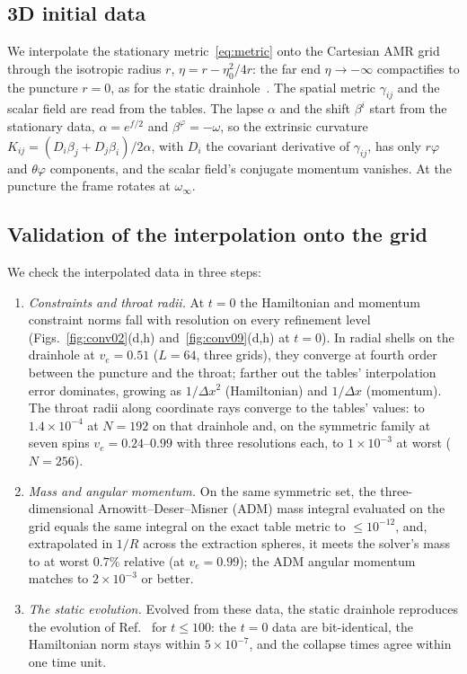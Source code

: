 \documentclass[twocolumn,floatfix,aps,prd,superscriptaddress,nofootinbib]{revtex4-2}
\begin{document}
\subsection{3D initial data}
\label{sec:setup:id}

We interpolate the stationary metric~\eqref{eq:metric} onto the Cartesian AMR grid through the isotropic radius $r$, $\eta=r-\eta_0^2/4r$: the far end $\eta\to-\infty$ compactifies to the puncture $r=0$, as for the static drainhole~\cite{shirokov2026}. The spatial metric $\gamma_{ij}$ and the scalar field are read from the tables. The lapse $\alpha$ and the shift $\beta^i$ start from the stationary data, $\alpha=e^{f/2}$ and $\beta^\varphi=-\omega$, so the extrinsic curvature $K_{ij}=(D_i\beta_j+D_j\beta_i)/2\alpha$, with $D_i$ the covariant derivative of $\gamma_{ij}$, has only $r\varphi$ and $\theta\varphi$ components, and the scalar field's conjugate momentum vanishes. At the puncture the frame rotates at $\omega_\infty$.

\subsection{Validation of the interpolation onto the grid}
\label{sec:setup:checks}

We check the interpolated data in three steps:
\begin{enumerate}
\item\emph{Constraints and throat radii.} At $t=0$ the Hamiltonian and momentum constraint norms fall with resolution on every refinement level (Figs.~\ref{fig:conv02}(d,h) and~\ref{fig:conv09}(d,h) at $t=0$). In radial shells on the drainhole at $v_e=0.51$ ($L=64$, three grids), they converge at fourth order between the puncture and the throat; farther out the tables' interpolation error dominates, growing as $1/\Delta x^2$ (Hamiltonian) and $1/\Delta x$ (momentum). The throat radii along coordinate rays converge to the tables' values: to $1.4\times10^{-4}$ at $N=192$ on that drainhole and, on the symmetric family at seven spins $v_e=0.24$--$0.99$ with three resolutions each, to $1\times10^{-3}$ at worst ($N=256$).
\item\emph{Mass and angular momentum.} On the same symmetric set, the three-dimensional Arnowitt--Deser--Misner (ADM) mass integral evaluated on the grid equals the same integral on the exact table metric to $\le10^{-12}$, and, extrapolated in $1/R$ across the extraction spheres, it meets the solver's mass to at worst $0.7\%$ relative (at $v_e=0.99$); the ADM angular momentum matches to $2\times10^{-3}$ or better.
\item\emph{The static evolution.} Evolved from these data, the static drainhole reproduces the evolution of Ref.~\cite{shirokov2026c} for $t\le100$: the $t=0$ data are bit-identical, the Hamiltonian norm stays within $5\times10^{-7}$, and the collapse times agree within one time unit.
\end{enumerate}
\end{document}
